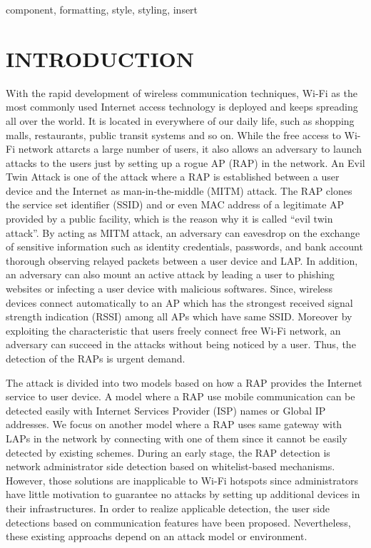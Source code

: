 \documentclass[conference]{IEEEtran}
\begin{document}
\begin{IEEEkeywords}
component, formatting, style, styling, insert
\end{IEEEkeywords}

\section{INTRODUCTION}
With the rapid development of wireless communication techniques, Wi-Fi as the most commonly used Internet access technology is deployed and keeps spreading all over the world.
It is located in everywhere of our daily life, such as shopping malls, restaurants, public transit systems and so on.
While the free access to Wi-Fi network attarcts a large number of users, it also allows an adversary to launch attacks to the users just by setting up a rogue AP (RAP) in the network.
An Evil Twin Attack is one of the attack where a RAP is established between a user device and the Internet as man-in-the-middle (MITM) attack.
The RAP clones the service set identifier (SSID) and or even MAC address of a legitimate AP provided by a public facility, which is the reason why it is called ``evil twin attack''.
By acting as MITM attack, an adversary can eavesdrop on the exchange of sensitive information such as identity credentials, passwords, and bank account thorough observing relayed packets between a user device and LAP.
In addition, an adversary can also mount an active attack by leading a user to phishing websites or infecting a user device with malicious softwares.
Since, wireless devices connect automatically to an AP which has the strongest received signal strength indication (RSSI) among all APs which have same SSID.
Moreover by exploiting the characteristic that users freely connect free Wi-Fi network, an adversary can succeed in the attacks without being noticed by a user.
Thus, the detection of the RAPs is urgent demand.

The attack is divided into two models based on how a RAP provides the Internet service to user device.
A model where a RAP use mobile communication can be detected easily with Internet Services Provider (ISP) names or Global IP addresses\cite{rtt}.
We focus on another model where a RAP uses same gateway with LAPs in the network by connecting with one of them since it cannot be easily detected by existing schemes.
During an early stage, the RAP detection is network administrator side detection based on whitelist-based mechanisms\cite{prapd}\cite{clockskew }.
However, those solutions are inapplicable to Wi-Fi hotspots since administrators have little motivation to guarantee no attacks by setting up additional devices in their infrastructures.
In order to realize applicable detection, the user side detections based on communication features have been proposed\cite{rtt}\cite{previous}.
Nevertheless, these existing approachs depend on an attack model or environment.
\end{document}
